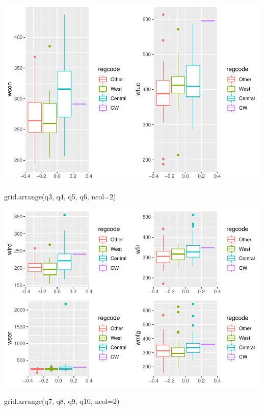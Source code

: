 \documentclass[]{article}
\newenvironment{Shaded}{}{}
\newcommand{\DataTypeTok}[1]{#1}
\newcommand{\DecValTok}[1]{#1}
\newcommand{\KeywordTok}[1]{\textcolor[rgb]{0.00,0.00,1.00}{#1}}
\newcommand{\NormalTok}[1]{#1}
\begin{document}
\includegraphics{Bagnard_Gaustad_Hartman_Leung_Lab_3_files/figure-latex/unnamed-chunk-15-1.pdf}

\begin{Shaded}
\begin{Highlighting}[]
\KeywordTok{grid.arrange}\NormalTok{(q3, q4, q5, q6, }\DataTypeTok{ncol=}\DecValTok{2}\NormalTok{)}
\end{Highlighting}
\end{Shaded}

\includegraphics{Bagnard_Gaustad_Hartman_Leung_Lab_3_files/figure-latex/unnamed-chunk-15-2.pdf}

\begin{Shaded}
\begin{Highlighting}[]
\KeywordTok{grid.arrange}\NormalTok{(q7, q8, q9, q10, }\DataTypeTok{ncol=}\DecValTok{2}\NormalTok{)}
\end{Highlighting}
\end{Shaded}
\end{document}

